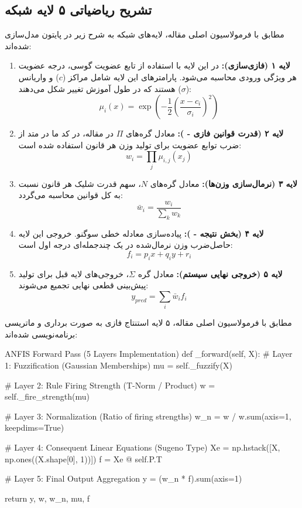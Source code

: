 \documentclass{article}
\begin{document}
	\subsection{تشریح ریاضیاتی ۵ لایه شبکه }
	مطابق با فرمولاسیون اصلی مقاله، لایه‌های شبکه به شرح زیر در پایتون مدل‌سازی شده‌اند:
	\begin{enumerate}
		\item \textbf{لایه ۱ (فازی‌سازی):} در این لایه با استفاده از تابع عضویت گوسی، درجه عضویت هر ویژگی ورودی محاسبه می‌شود. پارامترهای این لایه شامل مراکز ($c$) و واریانس ($\sigma$) هستند که در طول آموزش تغییر شکل می‌دهند:
		$$ \mu_{i}(x) = \exp\left( - \frac{1}{2} \left( \frac{x - c_i}{\sigma_i} \right)^2 \right) $$
		
		\item \textbf{لایه ۲ (قدرت قوانین فازی - ):} معادل گره‌های $\Pi$ در مقاله، در کد ما در متد  از ضرب توابع عضویت  برای تولید وزن هر قانون استفاده شده است:
		$$ w_i = \prod_{j} \mu_{i,j}(x_j) $$
		
		\item \textbf{لایه ۳ (نرمال‌سازی وزن‌ها):} معادل گره‌های $N$، سهم قدرت شلیک هر قانون نسبت به کل قوانین محاسبه می‌گردد:
		$$ \bar{w}_i = \frac{w_i}{\sum_{k} w_k} $$
		
		\item \textbf{لایه ۴ (بخش نتیجه - ):} پیاده‌سازی معادله خطی سوگنو. خروجی این لایه حاصل‌ضرب وزن نرمال‌شده در یک چندجمله‌ای درجه اول است:
		$$ f_i = p_i x + q_i y + r_i $$
		
		\item \textbf{لایه ۵ (خروجی نهایی سیستم):} معادل گره $\Sigma$، خروجی‌های لایه قبل برای تولید پیش‌بینی قطعی نهایی تجمیع می‌شوند:
		$$ y_{pred} = \sum_{i} \bar{w}_i f_i $$
	\end{enumerate}
	مطابق با فرمولاسیون اصلی مقاله، ۵ لایه استنتاج فازی به صورت برداری و ماتریسی برنامه‌نویسی شده‌اند:
	
	\begin{latin}
		\begin{vscodewindow}{ANFIS Forward Pass (5 Layers Implementation)}
def _forward(self, X):
# Layer 1: Fuzzification (Gaussian Memberships)
mu = self._fuzzify(X)

# Layer 2: Rule Firing Strength (T-Norm / Product)
w = self._fire_strength(mu)

# Layer 3: Normalization (Ratio of firing strengths)
w_n = w / w.sum(axis=1, keepdims=True)

# Layer 4: Consequent Linear Equations (Sugeno Type)
Xe = np.hstack([X, np.ones((X.shape[0], 1))])
f = Xe @ self.P.T

# Layer 5: Final Output Aggregation
y = (w_n * f).sum(axis=1)

return y, w, w_n, mu, f
		\end{vscodewindow}
	\end{latin}
	
\end{document}
